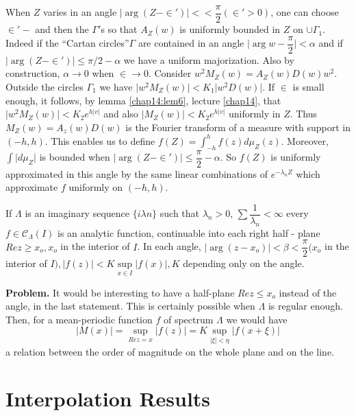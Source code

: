 When $Z$ varies in an angle $\big | \arg (Z - \in ') \big | <<
\dfrac{\pi}{2} (\in ' > 0)$, one can choose $\in ' -$
and then the $\Gamma'$s so that $A_Z (w)$ is uniformly bounded in $Z$
on $\cup \Gamma_1$. Indeed if the ``Cartan circles''\pageoriginale $\Gamma$ are
contained in an angle $\big | \arg w - \dfrac{\pi}{2}\big| < \alpha$ and if
$\big | \arg (Z - \in ') \big | \le \pi / 2 - \alpha$ we have a
uniform majorization. Also by construction, $\alpha \to 0$ when
$\in \to 0$. Consider $w^2 M_Z (w) = A_Z (w) D(w)
w^2$. Outside the circles $\Gamma_1$ we have $\big | w^2 M_Z (w) \big
| < K_1 \big | w^2 D(w) \big |$. If $\in $ is small enough, it
follows, by lemma \ref{chap14:lem6}, lecture \ref{chap14}, that $\big | w^2 M_Z (w) \big | <
K_2 e^{h | v |}$ and also $\big | M_Z (w) \big | < K_2 e^{h |v |} $
uniformly in $Z$. Thus $M_Z (w) = A_z (w) D(w)$ is the Fourier
transform of a measure with support in $(- h, h)$. This enables us to
define $f(Z) = \int^h_{-h} f(z) d \mu_Z (z)$. Moreover, $\int \big | d
\mu_Z \big |$ is bounded when $\big | \arg (Z - \in ') \big |
\le \dfrac{\pi}{2} - \alpha$. So $f (Z)$ is uniformly approximated in
this angle by the same linear combinations of $e^{- \lambda_nZ}$
which approximate $f$ uniformly on $(- h, h)$. 

\begin{theorem*} %
 If $\Lambda$ is an imaginary sequence $\big \{ i \lambda n \big\}$
 such that $\lambda_n>0$, $\sum \dfrac{1}{\lambda_n}< \infty$ every $f \in
 \mathscr{C}_\Lambda (I)$ is an analytic function, continuable into
 each right half - plane $Re z \ge x_o, x_o$ in the interior of
 $I$. In each angle, $\big | \arg (z - x_o) \big |< \beta <
 \dfrac{\pi}{2} (x_o$ in the interior of $I), \big | f (z) \big | <
 K \sup\limits_{x \in I} \big | f (x) \big |, K$ depending only on
 the angle. 
\end{theorem*}

\noindent
\textbf{Problem.} It would be interesting to have a half-plane $Re z
\le x_o$ instead of the angle, in the last statement. This is certainly
possible when $\Lambda$ is regular enough. Then, for a mean-periodic
function $f$ of spectrum $\Lambda$ we would have 
$$
\big | M(x) \big | = \sup_{Re z = x} \big | f (z) \big | = K \sup_{|
 \xi | < \eta} \big | f(x+ \xi ) \big | 
$$
a relation between the order of magnitude on the whole plane and on the line.

\section{Interpolation Results}\label{chap16:sec2}%

